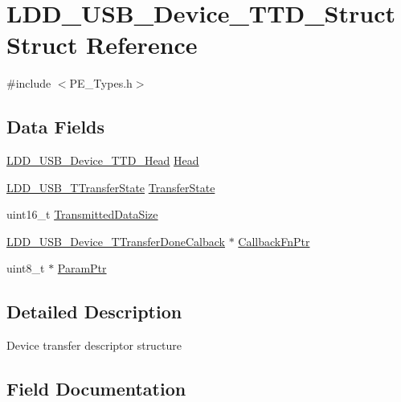 \hypertarget{struct_l_d_d___u_s_b___device___t_t_d___struct}{}\section{L\+D\+D\+\_\+\+U\+S\+B\+\_\+\+Device\+\_\+\+T\+T\+D\+\_\+\+Struct Struct Reference}
\label{struct_l_d_d___u_s_b___device___t_t_d___struct}


{\ttfamily \#include $<$P\+E\+\_\+\+Types.\+h$>$}

\subsection*{Data Fields}
\begin{DoxyCompactItemize}
\item 
\hyperlink{group___p_e___types__module_gac26d0354d0c874cd4e4580525d70c0c1}{L\+D\+D\+\_\+\+U\+S\+B\+\_\+\+Device\+\_\+\+T\+T\+D\+\_\+\+Head} \hyperlink{struct_l_d_d___u_s_b___device___t_t_d___struct_a7f3947a676f6ecd32e3fb342b7f07a35}{Head}
\item 
\hyperlink{group___p_e___types__module_gacf5f7e704d87aba90dc002ed7c0d28b4}{L\+D\+D\+\_\+\+U\+S\+B\+\_\+\+T\+Transfer\+State} \hyperlink{struct_l_d_d___u_s_b___device___t_t_d___struct_aca23e3743f56dc73206b79f885e9130f}{Transfer\+State}
\item 
uint16\+\_\+t \hyperlink{struct_l_d_d___u_s_b___device___t_t_d___struct_aeffbf1300fce5fc9ebf98f5760a96d38}{Transmitted\+Data\+Size}
\item 
\hyperlink{group___p_e___types__module_ga6545c6cb759931c367f2f974344c2201}{L\+D\+D\+\_\+\+U\+S\+B\+\_\+\+Device\+\_\+\+T\+Transfer\+Done\+Calback} $\ast$ \hyperlink{struct_l_d_d___u_s_b___device___t_t_d___struct_aaff3a74a2abea1e6b530ecfdaff8c584}{Callback\+Fn\+Ptr}
\item 
uint8\+\_\+t $\ast$ \hyperlink{struct_l_d_d___u_s_b___device___t_t_d___struct_ab1f3a3912ae70d748c5891aa91804de4}{Param\+Ptr}
\end{DoxyCompactItemize}


\subsection{Detailed Description}
Device transfer descriptor structure 

\subsection{Field Documentation}
\mbox{\label{struct_l_d_d___u_s_b___device___t_t_d___struct_aaff3a74a2abea1e6b530ecfdaff8c584}} 
